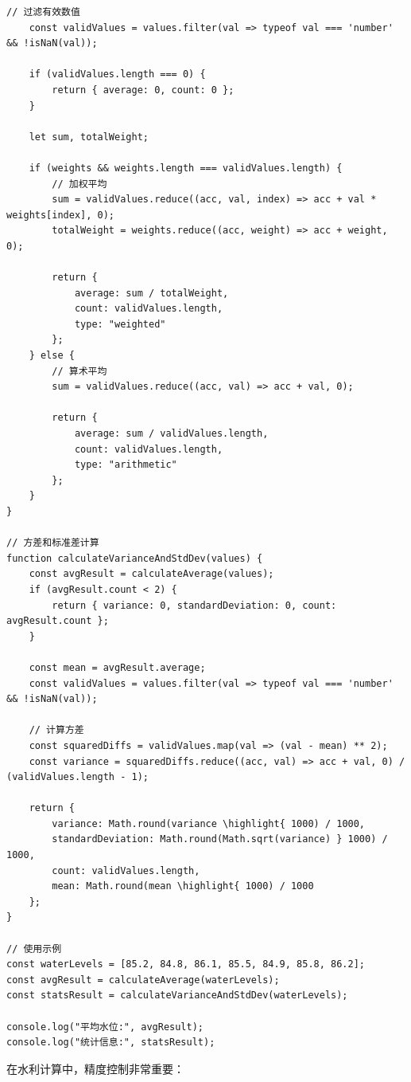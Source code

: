 {\begin{lstlisting}[style=javascript]
    // 过滤有效数值
    const validValues = values.filter(val => typeof val === 'number' && !isNaN(val));
    
    if (validValues.length === 0) {
        return { average: 0, count: 0 };
    }
    
    let sum, totalWeight;
    
    if (weights && weights.length === validValues.length) {
        // 加权平均
        sum = validValues.reduce((acc, val, index) => acc + val * weights[index], 0);
        totalWeight = weights.reduce((acc, weight) => acc + weight, 0);
        
        return {
            average: sum / totalWeight,
            count: validValues.length,
            type: "weighted"
        };
    } else {
        // 算术平均
        sum = validValues.reduce((acc, val) => acc + val, 0);
        
        return {
            average: sum / validValues.length,
            count: validValues.length,
            type: "arithmetic"
        };
    }
}

// 方差和标准差计算
function calculateVarianceAndStdDev(values) {
    const avgResult = calculateAverage(values);
    if (avgResult.count < 2) {
        return { variance: 0, standardDeviation: 0, count: avgResult.count };
    }
    
    const mean = avgResult.average;
    const validValues = values.filter(val => typeof val === 'number' && !isNaN(val));
    
    // 计算方差
    const squaredDiffs = validValues.map(val => (val - mean) ** 2);
    const variance = squaredDiffs.reduce((acc, val) => acc + val, 0) / (validValues.length - 1);
    
    return {
        variance: Math.round(variance \highlight{ 1000) / 1000,
        standardDeviation: Math.round(Math.sqrt(variance) } 1000) / 1000,
        count: validValues.length,
        mean: Math.round(mean \highlight{ 1000) / 1000
    };
}

// 使用示例
const waterLevels = [85.2, 84.8, 86.1, 85.5, 84.9, 85.8, 86.2];
const avgResult = calculateAverage(waterLevels);
const statsResult = calculateVarianceAndStdDev(waterLevels);

console.log("平均水位:", avgResult);
console.log("统计信息:", statsResult);
\end{lstlisting}


在水利计算中，精度控制非常重要：

}
